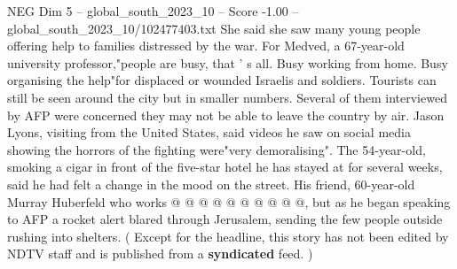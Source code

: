 \begin{textsample}{NEG Dim 5 – global\_south\_2023\_10 – Score -1.00 – global\_south\_2023\_10/102477403.txt}
She said she saw many young people offering help to families distressed by the war.
For Medved, a 67-year-old university professor,"people are busy, that ' s all.
Busy working from home.
Busy organising the help"for displaced or wounded Israelis and soldiers.
Tourists can still be seen around the city but in smaller numbers.
Several of them interviewed by AFP were concerned they may not be able to leave the country by air.
Jason Lyons, visiting from the United States, said videos he saw on social media showing the horrors of the fighting were"very demoralising".
The 54-year-old, smoking a cigar in front of the five-star hotel he has stayed at for several weeks, said he had felt a change in the mood on the street.
His friend, 60-year-old Murray Huberfeld who works @ @ @ @ @ @ @ @ @ @, but as he began speaking to AFP a rocket alert blared through Jerusalem, sending the few people outside rushing into shelters. ( Except for the headline, this story has not been edited by NDTV staff and is published from a \textbf{syndicated} feed. )

\end{textsample}
